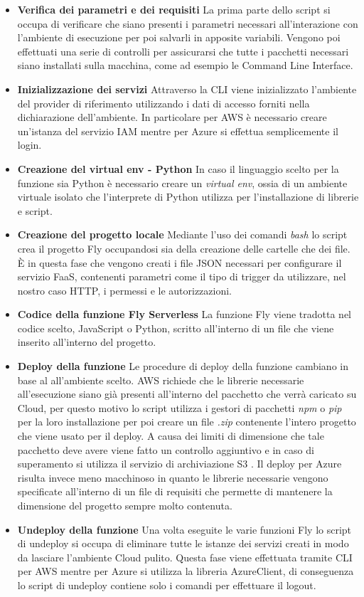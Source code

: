 \begin{itemize}
    \item\textbf{Verifica dei parametri e dei requisiti} La prima parte dello script si occupa di verificare che siano presenti i parametri necessari all'interazione con l'ambiente di esecuzione per poi salvarli in apposite variabili. Vengono poi effettuati una serie di controlli per assicurarsi che tutte i pacchetti necessari siano installati sulla macchina, come ad esempio le Command Line Interface.
    \item\textbf{Inizializzazione dei servizi} Attraverso la CLI viene inizializzato l'ambiente del provider di riferimento utilizzando i dati di accesso forniti nella dichiarazione dell'ambiente. In particolare per AWS è necessario creare un'istanza del servizio IAM \cite{IAM} mentre per Azure si effettua semplicemente il login.
    \item\textbf{Creazione del virtual env - Python} In caso il linguaggio scelto per la funzione sia Python è necessario creare un \textit{virtual env}, ossia di un ambiente virtuale isolato che l'interprete di Python utilizza per l'installazione di librerie e script.
    \item\textbf{Creazione del progetto locale} Mediante l'uso dei comandi \textit{bash} lo script crea il progetto Fly occupandosi sia della creazione delle cartelle che dei file. È in questa fase che vengono creati i file JSON necessari per configurare il servizio FaaS, contenenti parametri come il tipo di trigger da utilizzare, nel nostro caso HTTP, i permessi e le autorizzazioni.
    \item\textbf{Codice della funzione Fly Serverless} La funzione Fly viene tradotta nel codice scelto, JavaScript o Python, scritto all'interno di un file che viene inserito all'interno del progetto.
    \item\textbf{Deploy della funzione} Le procedure di deploy della funzione cambiano in base al all'ambiente scelto. AWS richiede che le librerie necessarie all'esecuzione siano già presenti all'interno del pacchetto che verrà caricato su Cloud, per questo motivo lo script utilizza i gestori di pacchetti \textit{npm} o \textit{pip} per la loro installazione per poi creare un file \textit{.zip} contenente l'intero progetto che viene usato per il deploy. A causa dei limiti di dimensione che tale pacchetto deve avere viene fatto un controllo aggiuntivo e in caso di superamento si utilizza il servizio di archiviazione S3 \cite{S3}. Il deploy per Azure risulta invece meno macchinoso in quanto le librerie necessarie vengono specificate all'interno di un file di requisiti che permette di mantenere la dimensione del progetto sempre molto contenuta.
    \item\textbf{Undeploy della funzione} Una volta eseguite le varie funzioni Fly lo script di undeploy si occupa di eliminare tutte le istanze dei servizi creati in modo da lasciare l'ambiente Cloud pulito. Questa fase viene effettuata tramite CLI per AWS mentre per Azure si utilizza la libreria AzureClient, di conseguenza lo script di undeploy contiene solo i comandi per effettuare il logout.
\end{itemize}


